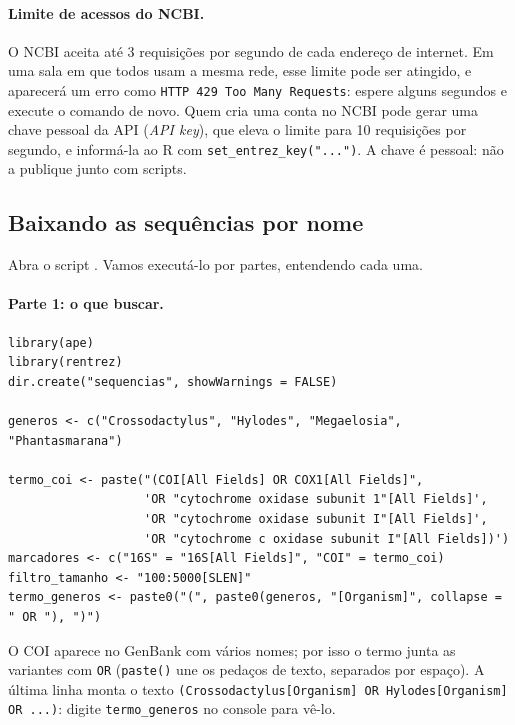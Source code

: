 \documentclass[11pt,a4paper]{article}
\newcommand{\arq}[1]{\path{#1}}
\begin{document}
\paragraph{Limite de acessos do NCBI.} O NCBI aceita até 3 requisições por segundo de cada
endereço de internet. Em uma sala em que todos usam a mesma rede, esse limite pode ser atingido,
e aparecerá um erro como \texttt{HTTP 429 Too Many Requests}: espere alguns segundos e execute
o comando de novo. Quem cria uma conta no NCBI pode gerar uma chave pessoal da API (\emph{API
key}), que eleva o limite para 10 requisições por segundo, e informá-la ao R com
\verb|set_entrez_key("...")|. A chave é pessoal: não a publique junto com scripts.

\subsection{Baixando as sequências por nome}

Abra o script \arq{R/02_baixar_por_nome.R}. Vamos executá-lo por partes, entendendo cada uma.

\paragraph{Parte 1: o que buscar.}
\begin{Verbatim}[fontsize=\footnotesize]
library(ape)
library(rentrez)
dir.create("sequencias", showWarnings = FALSE)

generos <- c("Crossodactylus", "Hylodes", "Megaelosia", "Phantasmarana")

termo_coi <- paste("(COI[All Fields] OR COX1[All Fields]",
                   'OR "cytochrome oxidase subunit 1"[All Fields]',
                   'OR "cytochrome oxidase subunit I"[All Fields]',
                   'OR "cytochrome c oxidase subunit I"[All Fields])')
marcadores <- c("16S" = "16S[All Fields]", "COI" = termo_coi)
filtro_tamanho <- "100:5000[SLEN]"
termo_generos <- paste0("(", paste0(generos, "[Organism]", collapse = " OR "), ")")
\end{Verbatim}
O COI aparece no GenBank com vários nomes; por isso o termo junta as variantes com \verb|OR|
(\verb|paste()| une os pedaços de texto, separados por espaço). A última linha monta o texto
\verb|(Crossodactylus[Organism] OR Hylodes[Organism] OR ...)|: digite \verb|termo_generos| no
console para vê-lo.
\end{document}
